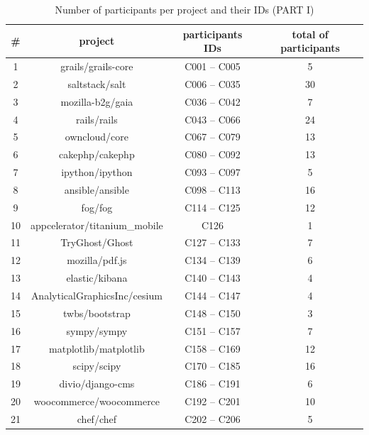 \begin{appendices}
	\begin{table}[htb]
	\centering
	\caption{Number of participants per project and their IDs (PART I)}
	\begin{tabular}{|c|c|c|c|}
		\hline
		\textbf{\#} & \multicolumn{1}{c|}{\textbf{project}} & \textbf{participants IDs } & \textbf{total of participants} \bigstrut\\
		\hline
		1     & grails/grails-core & C001 -- C005 & 5 \bigstrut\\
		\hline
		2     & saltstack/salt & C006 -- C035 & 30 \bigstrut\\
		\hline
		3     & mozilla-b2g/gaia & C036 -- C042 & 7 \bigstrut\\
		\hline
		4     & rails/rails & C043 -- C066 & 24 \bigstrut\\
		\hline
		5     & owncloud/core & C067 -- C079 & 13 \bigstrut\\
		\hline
		6     & cakephp/cakephp & C080 -- C092 & 13 \bigstrut\\
		\hline
		7     & ipython/ipython & C093 -- C097 & 5 \bigstrut\\
		\hline
		8     & ansible/ansible & C098 -- C113 & 16 \bigstrut\\
		\hline
		9     & fog/fog & C114 -- C125 & 12 \bigstrut\\
		\hline
		10    & appcelerator/titanium\_mobile & C126  & 1 \bigstrut\\
		\hline
		11    & TryGhost/Ghost & C127 -- C133 & 7 \bigstrut\\
		\hline
		12    & mozilla/pdf.js & C134 -- C139 & 6 \bigstrut\\
		\hline
		13    & elastic/kibana & C140 -- C143 & 4 \bigstrut\\
		\hline
		14    & AnalyticalGraphicsInc/cesium & C144 -- C147 & 4 \bigstrut\\
		\hline
		15    & twbs/bootstrap & C148 -- C150 & 3 \bigstrut\\
		\hline
		16    & sympy/sympy & C151 -- C157 & 7 \bigstrut\\
		\hline
		17    & matplotlib/matplotlib & C158 -- C169 & 12 \bigstrut\\
		\hline
		18    & scipy/scipy & C170 -- C185 & 16 \bigstrut\\
		\hline
		19    & divio/django-cms & C186 -- C191 & 6 \bigstrut\\
		\hline
		20    & woocommerce/woocommerce & C192 -- C201 & 10 \bigstrut\\
		\hline
		21    & chef/chef & C202 -- C206 & 5 \bigstrut\\

\end{tabular}
\end{table}
\end{appendices}

